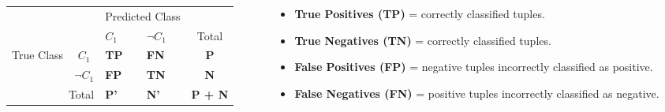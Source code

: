 \begin{columns}[T]
	\begin{column}[T]{0.45\textwidth}
		\begin{tabular}{c|c|p{1cm}|p{1cm}|c|}

			\multicolumn{2}{c|}{\multirow{2}{*}{}} & \multicolumn{2}{c|}{Predicted Class} &                                           \\\cline{3-4}
			\multicolumn{2}{c|}{}                  & $C_1$                                & $\neg C_1$  & Total                       \\\hline
			\multirow{2}{*}{True Class}            & $C_1$                                & \textbf{TP} & \textbf{FN}    & \textbf{P} \\\cline{2-4}
			                                       & $\neg C_1$                           & \textbf{FP} & \textbf{TN}    & \textbf{N} \\\hline
			\multicolumn{2}{r|}{Total}             & \textbf{P'}                          & \textbf{N'} & \textbf{P + N}
		\end{tabular}

	\end{column}

	\begin{column}[T]{0.5\textwidth}
		\footnotesize
		\begin{itemize}
			\item \textbf{True Positives (TP)} = correctly classified tuples.
			\item \textbf{True Negatives (TN)} = correctly classified tuples.
			\item \textbf{False Positives (FP)} = negative tuples incorrectly classified as positive.
			\item \textbf{False Negatives (FN)} = positive tuples incorrectly classified as negative.
		\end{itemize}
	\end{column}
\end{columns}
